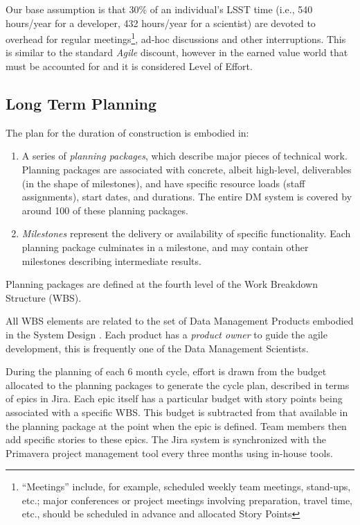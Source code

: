 Our base assumption is that 30\% of an individual's LSST time (i.e., 540 hours/year for a developer, 432 hours/year for a scientist) are devoted to overhead for regular meetings\footnote{``Meetings'' include, for example, scheduled weekly team meetings, stand-ups, etc.; major conferences or project meetings involving preparation, travel time, etc., should be scheduled in advance and allocated Story Points}, ad-hoc discussions and other interruptions.
This is similar to the standard \emph{Agile} discount, however in the earned value world that must be accounted for and it is considered Level of Effort.


\subsection{Long Term Planning}
\label{sec:long-term-plan}

The plan for the duration of construction is embodied in:

\begin{enumerate}
\item
  A series of \emph{planning packages}, which describe major pieces of
  technical work. Planning packages are associated with concrete, albeit
  high-level, deliverables (in the shape of milestones), and have
  specific resource loads (staff assignments), start dates, and
  durations. The entire DM system is covered by around 100 of these
  planning packages.
\item
  \emph{Milestones} represent the delivery or availability of specific
  functionality. Each planning package culminates in a milestone, and
  may contain other milestones describing intermediate results.
\end{enumerate}

Planning packages are defined at the fourth level of the Work Breakdown Structure (WBS).

All WBS elements are related to the set of Data Management Products embodied in the System Design \cite{LDM-148}.
Each product has a \emph{product owner} to guide the agile development, this is frequently one of the Data Management Scientists.

During the planning of each 6 month cycle, effort is drawn from the budget allocated to the planning packages to generate the cycle plan, described in terms of epics in Jira.
Each epic itself has a particular budget with story points being associated with a specific WBS.
This budget is subtracted from that available in the planning package at the point when the epic is defined.
Team members then add specific stories to these epics.
The Jira system is synchronized with the Primavera project management tool every three months using in-house tools.

